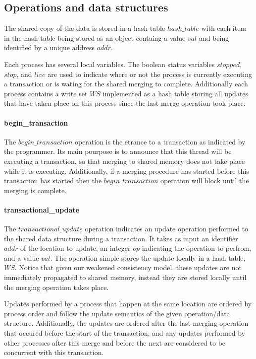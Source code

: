 \documentclass[11pt,letterpaper]{article}
\begin{document}
\subsection{Operations and data structures}

The shared copy of the data is stored in a hash table
$\mathit{hash\_table}$ with each item in the hash-table
being stored as an object
containg a value $\mathit{val}$ and
being identified by a unique address $\mathit{addr}$.

Each process has several local variables.
The boolean status variables $\mathit{stopped}$,
$\mathit{stop}$, and $\mathit{live}$ are used to indicate
where or not the process is currently executing a transaction
or is wating for the shared merging to complete.
Additionally each process contains a write set $\mathit{WS}$
implemented as a hash table
storing all updates that have taken place on this process
since the last merge operation took place.

\paragraph{begin\_transaction}
The $\mathit{begin\_transaction}$ operation is the etrance to
a transaction as indicated by the programmer.
Its main pourpose is to announce that this thread will be executing
a transaction, so that merging to shared memory does not take place
while it is executing.
Additionally, if a merging procedure has started before this transaction
has started then the $\mathit{begin\_transaction}$ operation will
block until the merging is complete.




\paragraph{transactional\_update}
The $\mathit{transactional\_update}$ operation indicates an update operation
performed to the shared data structure during a transaction.
It takes as input an identifier $\mathit{addr}$ of the location to update,
an integer $\mathit{op}$ indicating the operation to perfrom, and a value $\mathit{val}$.
The operation simple stores the update locally in a hash table, $\mathit{WS}$.
Notice that given our weakened consistency model, these updates are not
immediately propagated to shared memory, instead
they are stored locally until the merging operation takes place.

Updates performed by a process that happen at the same location are ordered by process order and
follow the update semantics of the given operation/data structure.
Additionally, the updates are ordered after the last merging operation that occured before
the start of the transaction, and any updates performed by other processes after this merge and before
the next are considered to be concurrent with this transaction.
\end{document}
